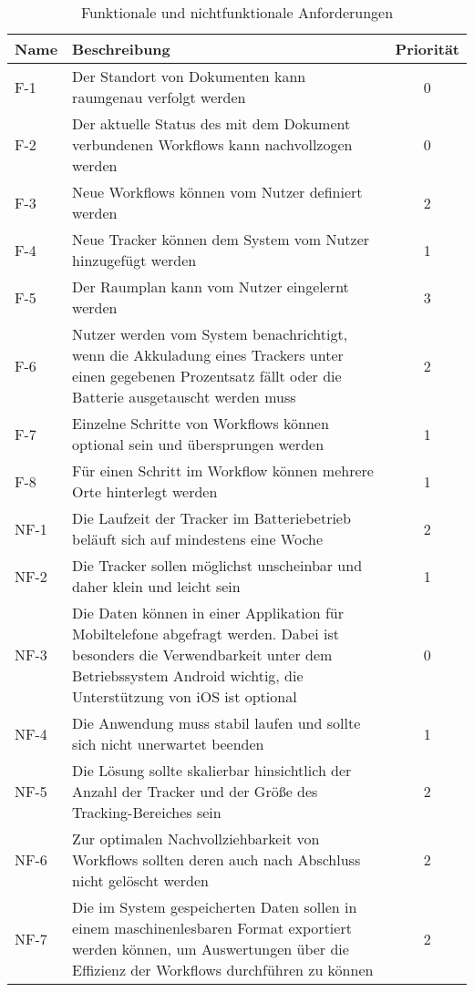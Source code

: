 \begin{table}[htbp]
  \renewcommand{\arraystretch}{1.5}
\centering
\begin{tabularx}{0.9\textwidth}{lXc}
  \textbf{Name} & \textbf{Beschreibung} & \textbf{Priorität} \\
  \hline
  F-1 \label{fa:tracking} & Der Standort von Dokumenten kann raumgenau verfolgt werden & 0 \\
  F-2 \label{fa:workflow} & Der aktuelle Status des mit dem Dokument verbundenen Workflows kann
  nachvollzogen werden & 0 \\
  F-3 \label{fa:neue-workflows} & Neue Workflows können vom Nutzer definiert werden & 2 \\
  F-4 \label{fa:neue-tracker} & Neue Tracker können dem System vom Nutzer hinzugefügt werden & 1 \\
  F-5 \label{fa:raumplan} & Der Raumplan kann vom Nutzer eingelernt werden & 3 \\
	F-6 \label{fa:benachrichtigung} & Nutzer werden vom System benachrichtigt, wenn die Akkuladung eines
	Trackers unter einen gegebenen Prozentsatz fällt oder die Batterie ausgetauscht werden muss & 2 \\
	F-7 \label{fa:optionale-schritte} & Einzelne Schritte von Workflows können optional sein und
	übersprungen werden & 1 \\
	F-8 \label{fa:mehrere-orte} & Für einen Schritt im Workflow können mehrere Orte hinterlegt werden & 1 \\
  \midrule
  NF-1 \label{nf:akku} & Die Laufzeit der Tracker im Batteriebetrieb beläuft sich auf mindestens
  eine Woche & 2 \\
  NF-2 \label{nf:klein} & Die Tracker sollen möglichst unscheinbar und daher klein und leicht sein
  & 1 \\
  NF-3 \label{nf:app} & Die Daten können in einer Applikation für Mobiltelefone abgefragt werden.
  Dabei ist besonders die Verwendbarkeit unter dem Betriebssystem Android wichtig, die Unterstützung
 von iOS ist optional & 0 \\
  NF-4 \label{nf:stabilität} & Die Anwendung muss stabil laufen und sollte sich nicht unerwartet
  beenden & 1 \\
  NF-5 \label{nf:skalierbarkeit} & Die Lösung sollte skalierbar hinsichtlich der Anzahl der Tracker
  und der Größe des Tracking-Bereiches sein & 2 \\
  NF-6 \label{nf:nachvollziehbarkeit} & Zur optimalen Nachvollziehbarkeit von Workflows sollten deren auch
  nach Abschluss nicht gelöscht werden & 2 \\
	NF-7 \label{nf:datenexport} & Die im System gespeicherten Daten sollen in einem maschinenlesbaren
	Format exportiert werden können, um Auswertungen über die Effizienz der Workflows durchführen zu
	können & 2 \\
\end{tabularx}
\caption{Funktionale und nichtfunktionale Anforderungen}
\label{tab:anforderungen}
\end{table}
